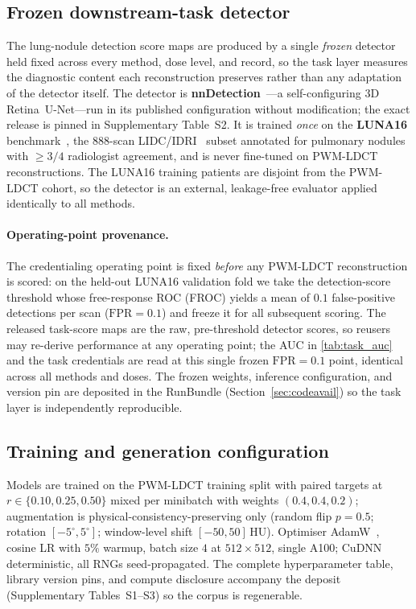 \documentclass{article}
\begin{document}
\subsection{Frozen downstream-task detector}
\label{sec:detector}
The lung-nodule detection score maps are produced by a single
\emph{frozen} detector held fixed across every method, dose level, and
record, so the task layer measures the diagnostic content each
reconstruction preserves rather than any adaptation of the detector
itself. The detector is \textbf{nnDetection}~\citep{baumgartner2021nndetection}---a
self-configuring 3D Retina~U-Net---run in its published configuration
without modification; the exact release is pinned in Supplementary
Table~S2. It is trained \emph{once} on the \textbf{LUNA16}
benchmark~\citep{setio2017luna16}, the 888-scan
LIDC/IDRI~\citep{lidc_idri} subset annotated for pulmonary nodules with
$\geq 3/4$ radiologist agreement, and is never fine-tuned on PWM-LDCT
reconstructions. The LUNA16 training patients are disjoint from the
PWM-LDCT cohort, so the detector is an external, leakage-free evaluator
applied identically to all methods.

\paragraph{Operating-point provenance.} The credentialing operating
point is fixed \emph{before} any PWM-LDCT reconstruction is scored: on
the held-out LUNA16 validation fold we take the detection-score
threshold whose free-response ROC (FROC) yields a mean of $0.1$
false-positive detections per scan ($\textrm{FPR}=0.1$) and freeze it
for all subsequent scoring. The released task-score maps are the raw,
pre-threshold detector scores, so reusers may re-derive performance at
any operating point; the AUC in \autoref{tab:task_auc} and the task
credentials are read at this single frozen $\textrm{FPR}=0.1$ point,
identical across all methods and doses. The frozen weights, inference
configuration, and version pin are deposited in the RunBundle
(Section~\ref{sec:codeavail}) so the task layer is independently
reproducible.

\subsection{Training and generation configuration}
Models are trained on the PWM-LDCT training split with paired targets at
$r \in \{0.10,0.25,0.50\}$ mixed per minibatch with weights $(0.4,0.4,0.2)$;
augmentation is physical-consistency-preserving only (random flip
$p{=}0.5$; rotation $[-5^\circ,5^\circ]$; window-level shift
$[-50,50]$\,HU). Optimiser AdamW~\citep{loshchilov2018adamw}, cosine LR
with $5\%$ warmup, batch size $4$ at $512\times512$, single A100; CuDNN
deterministic, all RNGs seed-propagated. The complete hyperparameter
table, library version pins, and compute disclosure accompany the deposit
(Supplementary Tables~S1--S3) so the corpus is regenerable.
\end{document}
